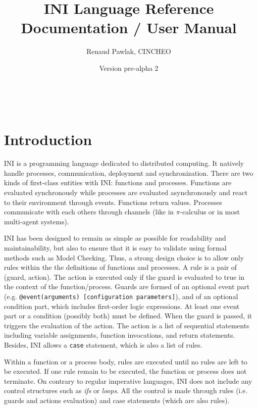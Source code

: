 \documentclass[11pt]{article}
\begin{document}
\thispagestyle{empty}

\title{INI Language Reference Documentation / User Manual}
\author{Renaud Pawlak, CINCHEO}

\date{Version pre-alpha 2}
\maketitle
\

\tableofcontents

\section{Introduction}

INI is a programming language dedicated to distributed computing. It natively handle processes, communication, deployment and synchronization. There are two kinds of first-class entities with INI: functions and processes. Functions are evaluated synchronously while processes are evaluated asynchronously and react to their environment through events. Functions return values. Processes communicate with each others through channels (like in $\pi$-calculus or in most multi-agent systems).

INI has been designed to remain as simple as possible for readability and maintainability, but also to ensure that it is easy to validate using formal methods such as Model Checking. Thus, a strong design choice is to allow only rules within the the definitions of functions and processes. A rule is a pair of (guard, action). The action is executed only if the guard is evaluated to true in the context of the function/process. Guards are formed of an optional event part (e.g. \texttt{@event(arguments) [configuration parameters]}), and of an optional condition part, which includes first-order logic expressions. At least one event part or a condition (possibly both) must be defined. When the guard is passed, it triggers the evaluation of the action. The action is a list of sequential statements including variable assignments, function invocations, and return statements. Besides, INI allows a \texttt{case} statement, which is also a list of rules.

Within a function or a process body, rules are executed until no rules are left to be executed. If one rule remain to be executed, the function or process does not terminate. On contrary to regular imperative languages, INI does not include any control structures such as \emph{ifs} or \emph{loops}. All the control is made through rules (i.e. guards and actions evaluation) and case statements (which are also rules).
\end{document}
